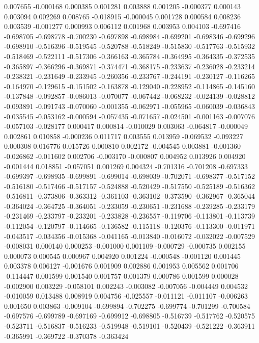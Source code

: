 0.007655
-0.000168
0.000385
0.001281
0.003888
0.001205
-0.000377
0.000143
0.003094
0.002269
0.008765
-0.018915
-0.000045
0.001728
0.000584
0.008236
0.003539
-0.001277
0.000993
0.006112
0.001968
0.003953
0.004103
-0.697416
-0.698705
-0.698778
-0.700230
-0.697898
-0.698984
-0.699201
-0.698346
-0.699296
-0.698910
-0.516396
-0.519545
-0.520788
-0.518249
-0.515830
-0.517763
-0.515932
-0.518469
-0.522111
-0.517306
-0.366163
-0.365784
-0.364995
-0.364335
-0.372535
-0.365897
-0.366296
-0.369871
-0.374471
-0.368175
-0.233637
-0.236028
-0.233214
-0.238321
-0.231649
-0.233945
-0.260356
-0.233767
-0.244191
-0.230127
-0.116265
-0.164970
-0.129615
-0.151502
-0.163878
-0.129040
-0.228952
-0.114865
-0.145160
-0.137848
-0.092857
-0.086013
-0.070077
-0.067442
-0.068232
-0.024139
-0.028812
-0.093891
-0.091743
-0.070060
-0.001355
-0.062971
-0.055965
-0.060039
-0.036843
-0.035545
-0.053162
-0.000594
-0.057435
-0.071657
-0.024501
-0.001163
-0.007076
-0.057103
-0.028177
0.000417
0.000814
-0.010029
0.003063
-0.064817
-0.000049
0.002861
0.010858
-0.000236
0.011717
0.003555
0.013959
-0.069532
-0.093227
0.000308
0.016776
0.015726
0.000810
0.002172
-0.004545
0.003881
-0.001360
-0.026862
-0.011602
0.002706
-0.003170
-0.000807
0.004952
0.013926
0.004920
-0.001444
0.018851
-0.057051
0.001269
0.004324
-0.701316
-0.701208
-0.697333
-0.699397
-0.698935
-0.699891
-0.699014
-0.698039
-0.702071
-0.698377
-0.517152
-0.516180
-0.517466
-0.517157
-0.524888
-0.520429
-0.517550
-0.525189
-0.516362
-0.516811
-0.373806
-0.363312
-0.361103
-0.363102
-0.373590
-0.362967
-0.365044
-0.364024
-0.364725
-0.364051
-0.233059
-0.230651
-0.231688
-0.239285
-0.233179
-0.231469
-0.233797
-0.233201
-0.233828
-0.236557
-0.119706
-0.113801
-0.113739
-0.112054
-0.120797
-0.114665
-0.136582
-0.115118
-0.120376
-0.113300
-0.011971
-0.043517
-0.034356
-0.015368
-0.041165
-0.013840
-0.016072
-0.032022
-0.007529
-0.008031
0.000140
0.000253
-0.001000
0.001109
-0.000729
-0.000735
0.002155
0.000073
0.000545
0.000967
0.004920
0.001224
-0.000548
-0.001120
0.001445
0.003378
0.006127
-0.001676
0.001909
0.002886
0.001953
0.005562
0.001706
-0.114447
0.001599
0.001540
0.001757
0.001379
0.000786
0.001599
0.000028
-0.002900
0.003229
-0.058101
0.002243
-0.003082
-0.007056
-0.004449
0.004532
-0.010059
0.013488
0.008919
0.004756
-0.025557
-0.011121
-0.011107
-0.006263
0.001650
0.003863
-0.009104
-0.699894
-0.702275
-0.699774
-0.701299
-0.700584
-0.697576
-0.699789
-0.697169
-0.699912
-0.698805
-0.516739
-0.517762
-0.520575
-0.523711
-0.516837
-0.516233
-0.519948
-0.519101
-0.520439
-0.521222
-0.363911
-0.365991
-0.369722
-0.370378
-0.363424
